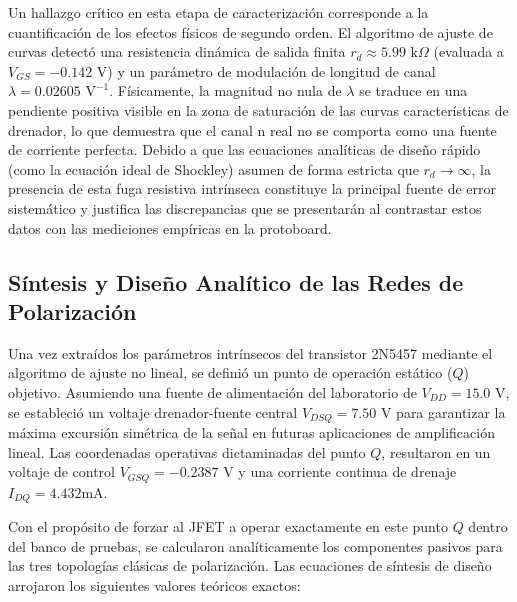 \documentclass[conference]{IEEEtran}
\begin{document}
Un hallazgo crítico en esta etapa de caracterización corresponde a la
cuantificación de los efectos físicos de segundo orden. El algoritmo de ajuste
de curvas detectó una resistencia dinámica de salida finita $r_d \approx
    5.99\text{ k}\Omega$ (evaluada a $V_{GS} = -0.142\text{ V}$) y un parámetro de
modulación de longitud de canal $\lambda = 0.02605\text{ V}^{-1}$. Físicamente,
la magnitud no nula de $\lambda$ se traduce en una pendiente positiva visible
en la zona de saturación de las curvas características de drenador, lo que
demuestra que el canal n real no se comporta como una fuente de corriente
perfecta. Debido a que las ecuaciones analíticas de diseño rápido (como la
ecuación ideal de Shockley) asumen de forma estricta que $r_d \rightarrow
    \infty$, la presencia de esta fuga resistiva intrínseca constituye la principal
fuente de error sistemático y justifica las discrepancias que se presentarán al
contrastar estos datos con las mediciones empíricas en la protoboard.

\subsection{Síntesis y Diseño Analítico de las Redes de Polarización}

Una vez extraídos los parámetros intrínsecos del transistor 2N5457 mediante el
algoritmo de ajuste no lineal, se definió un punto de operación estático ($Q$)
objetivo. Asumiendo una fuente de alimentación del laboratorio de $V_{DD} =
    15.0\text{ V}$, se estableció un voltaje drenador-fuente central $V_{DSQ} =
    7.50\text{ V}$ para garantizar la máxima excursión simétrica de la señal en
futuras aplicaciones de amplificación lineal. Las coordenadas operativas
dictaminadas del punto $Q$, resultaron en un voltaje de control $V_{GSQ} =
    -0.2387\text{ V}$ y una corriente continua de drenaje $I_{DQ} = 4.432\text{
        mA}$.

Con el propósito de forzar al JFET a operar exactamente en este punto $Q$
dentro del banco de pruebas, se calcularon analíticamente los componentes
pasivos para las tres topologías clásicas de polarización. Las ecuaciones de
síntesis de diseño arrojaron los siguientes valores teóricos exactos:
\end{document}
